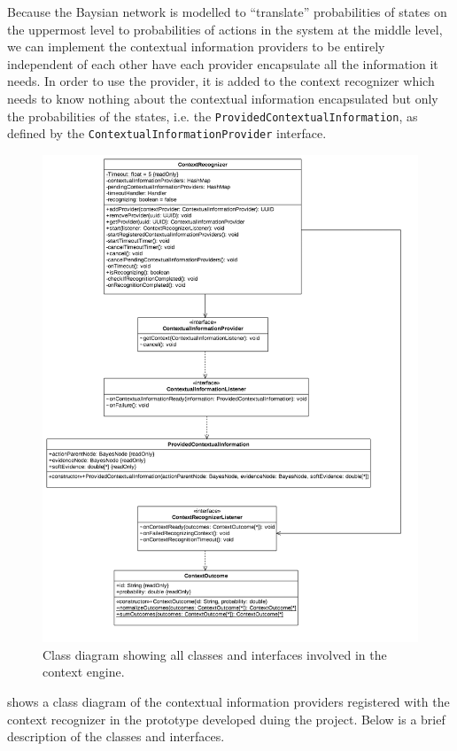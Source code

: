 Because the Baysian network is modelled to ``translate'' probabilities of states on the uppermost level to probabilities of actions in the system at the middle level, we can implement the contextual information providers to be entirely independent of each other have each provider encapsulate all the information it needs.
In order to use the provider, it is added to the context recognizer which needs to know nothing about the contextual information encapsulated but only the probabilities of the states, i.e. the \texttt{ProvidedContextualInformation}, as defined by the \texttt{ContextualInformationProvider} interface.

\begin{figure}[h!]
\centering
\includegraphics[width=\textwidth]{images/uml-context-engine}
\caption{Class diagram showing all classes and interfaces involved in the context engine.}
\label{fig:implementation:context-engine}
\end{figure}

 shows a class diagram of the contextual information providers registered with the context recognizer in the prototype developed duing the project. Below is a brief description of the classes and interfaces.

